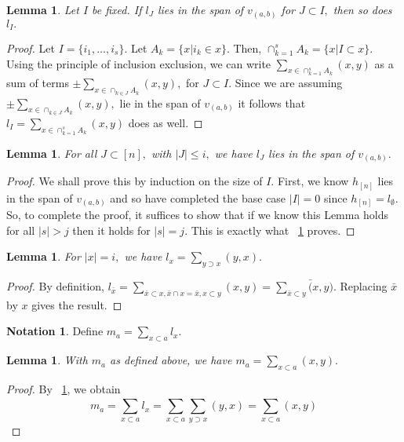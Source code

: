 \documentclass[10 pt]{amsart}
\theoremstyle{plain}
\newtheorem{lem}[thm]{Lemma}
\theoremstyle{definition}
\newtheorem{note}[thm]{Notation}
\theoremstyle{remark}
\numberwithin{equation}{section}
\begin{document}
\begin{lem}
\label{l_induction_step}
Let $I$ be fixed. If $l_J$ lies in the span of $v_{(a, b)}$ for $J \subset I,$ then so does $l_I.$

\end{lem}
\begin{proof}
Let $I = \{i_1,\ldots, i_s\}.$ Let $A_k = \{x | i_k \in x\}.$ Then, $\cap_{k=1}^s A_k = \{x | I \subset x\}.$ Using the principle of inclusion exclusion, we can write $\sum_{x \in\cap_{k=1}^s A_k} (x, y)$ as a sum of terms $\pm \sum_{x \in\cap_{k \in J} A_k} (x, y),$ for $J \subset I.$ Since we are assuming $\pm \sum_{x \in\cap_{k \in J} A_k} (x, y),$ lie in the span of $v_{(a, b)}$ it follows that $l_I = \sum_{x \in\cap_{k=1}^s A_k} (x, y)$ does as well.

\end{proof}

\begin{lem}
For all $J \subset [n],$ with $|J| \leq i,$ we have $l_{J}$ lies in the span of $v_{(a , b)}.$ 
\end{lem}
\begin{proof}
We shall prove this by induction on the size of $I.$ First, we know $h_{[n]}$ lies in the span of $v_{(a, b)}$ and so have completed the base case $|I| = 0$ since $h_{[n]} = l_{\emptyset}.$ So, to complete the proof, it suffices to show that if we know this Lemma holds for all $|s|>j$ then it holds for $|s| = j.$  This is exactly what ~\ref{l_induction_step} proves.
\end{proof}

\begin{lem}
\label{l_diag_equivalence}
For $|x| = i,$ we have $l_{x} = \sum_{y \supset x}^{}(y, x).$
\end{lem}
\begin{proof}
By definition, $l_{\bar x} = \sum_{\bar x\subset x,\bar x \cap x = \bar x,x\subset y}^{}(x, y) = \sum_{\bar x\subset y}^{}\bar (x, y).$ Replacing $\bar x$ by $x$ gives the result.
\end{proof}

\begin{note}
Define $m_a = \sum_{x \subset a}^{}l_{x}.$
\end{note}

\begin{lem}
\label{m_equivalence}
With $m_a$ as defined above, we have $m_a = \sum_{x\subset a}^{}(x, y).$
\end{lem}
\begin{proof}
By ~\ref{l_diag_equivalence}, we obtain
$$m_a = \sum_{x \subset a}^{}l_{x} = \sum_{x \subset a}^{}\sum_{y \supset x}^{}(y, x)= \sum_{x\subset a}^{}(x, y)$$
\end{proof}
\end{document}
